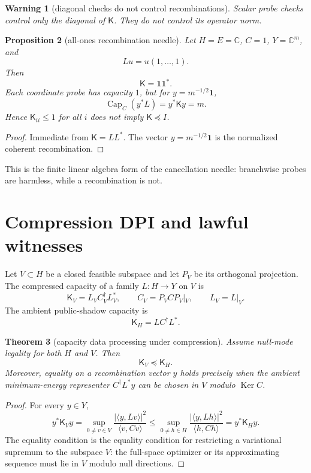 \documentclass[11pt]{article}
\newtheorem{theorem}{Theorem}[section]
\newtheorem{proposition}[theorem]{Proposition}
\newtheorem{warning}[theorem]{Warning}
\newcommand{\Capa}{\operatorname{Cap}}
\newcommand{\Ker}{\operatorname{Ker}}
\newcommand{\Kmat}{\mathsf K}
\begin{document}
\begin{warning}[diagonal checks do not control recombinations]
Scalar probe checks control only the diagonal of $\Kmat$.  They do not control its operator norm.
\end{warning}

\begin{proposition}[all-ones recombination needle]
Let $H=E=\mathbb C$, $C=1$, $Y=\mathbb C^m$, and
\[
Lu=u(1,\ldots,1).
\]
Then
\[
\Kmat=\mathbf 1\mathbf 1^*.
\]
Each coordinate probe has capacity $1$, but for $y=m^{-1/2}\mathbf 1$,
\[
\Capa_C(y^*L)=y^*\Kmat y=m.
\]
Hence $\Kmat_{ii}\le1$ for all $i$ does not imply $\Kmat\preceq I$.
\end{proposition}

\begin{proof}
Immediate from $\Kmat=LL^*$.  The vector $y=m^{-1/2}\mathbf1$ is the normalized coherent recombination.
\end{proof}

This is the finite linear algebra form of the cancellation needle: branchwise probes are harmless, while a recombination is not.

\section{Compression DPI and lawful witnesses}

Let $V\subset H$ be a closed feasible subspace and let $P_V$ be its orthogonal projection.  The compressed capacity of a family $L:H\to Y$ on $V$ is
\[
\Kmat_V=L_V C_V^\dagger L_V^*,
\qquad
C_V=P_V C P_V|_V,
\qquad
L_V=L|_V.
\]
The ambient public-shadow capacity is
\[
\Kmat_H=LC^\dagger L^*.
\]

\begin{theorem}[capacity data processing under compression]
Assume null-mode legality for both $H$ and $V$.  Then
\[
\boxed{\Kmat_V\preceq\Kmat_H.}
\]
Moreover, equality on a recombination vector $y$ holds precisely when the ambient minimum-energy representer $C^\dagger L^*y$ can be chosen in $V$ modulo $\Ker C$.
\end{theorem}

\begin{proof}
For every $y\in Y$,
\[
y^*\Kmat_V y
=\sup_{0\ne v\in V}\frac{|\langle y,Lv\rangle|^2}{\langle v,Cv\rangle}
\le
\sup_{0\ne h\in H}\frac{|\langle y,Lh\rangle|^2}{\langle h,Ch\rangle}
=y^*\Kmat_H y.
\]
The equality condition is the equality condition for restricting a variational supremum to the subspace $V$: the full-space optimizer or its approximating sequence must lie in $V$ modulo null directions.
\end{proof}
\end{document}

